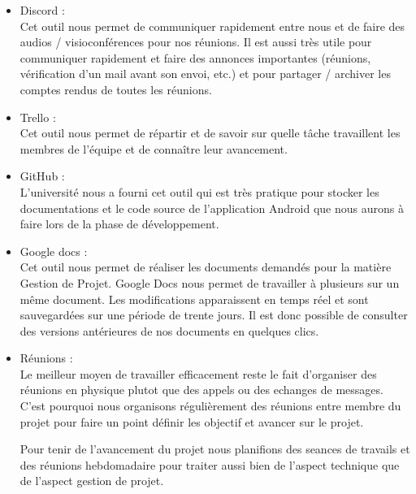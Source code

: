 \begin{itemize}
	\item Discord :\\
	Cet outil nous permet de communiquer rapidement entre nous et
de faire des audios / visioconférences pour nos réunions. Il est aussi très utile
pour communiquer rapidement et faire des annonces importantes (réunions,
vérification d’un mail avant son envoi, etc.) et pour partager / archiver les
comptes rendus de toutes les réunions.\\
	\item Trello :\\
	Cet outil nous permet de répartir et de savoir sur quelle tâche
travaillent les membres de l’équipe et de connaître leur avancement.\\
	\item GitHub :\\
	L’université nous a fourni cet outil qui est très pratique pour stocker
les documentations et le code source de l’application Android que nous
aurons à faire lors de la phase de développement.\\
	\item Google docs :\\
	Cet outil nous permet de réaliser les documents demandés
pour la matière Gestion de Projet. Google Docs nous permet de travailler à
plusieurs sur un même document. Les modifications apparaissent en temps
réel et sont sauvegardées sur une période de trente jours. Il est donc possible
de consulter des versions antérieures de nos documents en quelques clics.\\
	\item Réunions :\\
	Le meilleur moyen de travailler efficacement reste le fait d'organiser des réunions en physique 
	plutot que des appels ou des echanges de messages. C'est pourquoi nous organisons régulièrement des réunions
	entre membre du projet pour faire un point définir les objectif et avancer sur le projet.
\\ \newline

Pour tenir de l'avancement du projet nous planifions des seances de travails et des réunions hebdomadaire pour traiter
aussi bien de l'aspect technique que de l'aspect gestion de projet.
\end{itemize}
